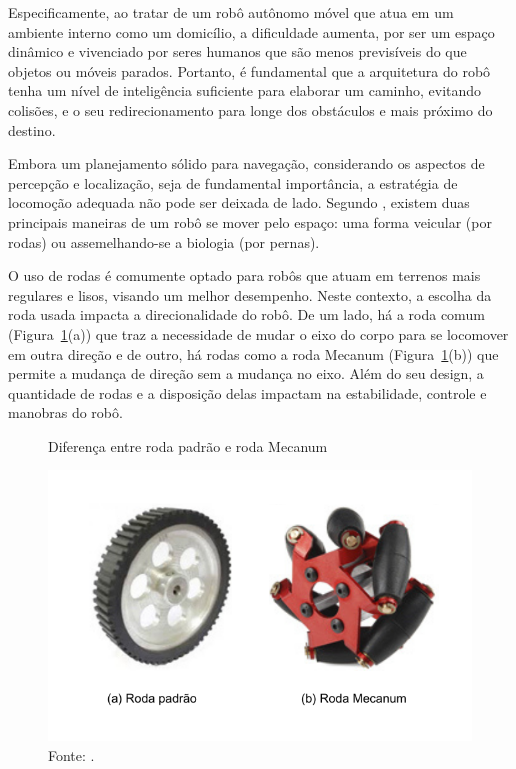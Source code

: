 Especificamente, ao tratar de um robô autônomo móvel que atua em um ambiente interno como um domicílio, a dificuldade aumenta, por ser um espaço dinâmico e vivenciado por seres humanos que são menos previsíveis do que objetos ou móveis parados. Portanto, é fundamental que a arquitetura do robô tenha um nível de inteligência suficiente para elaborar um caminho, evitando colisões, e o seu redirecionamento para longe dos obstáculos e mais próximo do destino.

Embora um planejamento sólido para navegação, considerando os aspectos de percepção e localização, seja de fundamental importância, a estratégia de locomoção adequada não pode ser deixada de lado. Segundo \citet{mobileRobotsSiegwart:2011}, existem duas principais maneiras de um robô se mover pelo espaço: uma forma veicular (por rodas) ou assemelhando-se a biologia (por pernas). 

O uso de rodas é comumente optado para robôs que atuam em terrenos mais regulares e lisos, visando um melhor desempenho. Neste contexto, a escolha da roda usada impacta a direcionalidade do robô. De um lado, há a roda comum (Figura~\ref{fig:rodas}(a)) que traz a necessidade de mudar o eixo do corpo para se locomover em outra direção e de outro, há rodas como a roda Mecanum (Figura~\ref{fig:rodas}(b)) que permite a mudança de direção sem a mudança no eixo. Além do seu design, a quantidade de rodas e a disposição delas impactam na estabilidade, controle e manobras do robô. 
 
\begin{figure}[h]
    \centering
    \caption{Diferença entre roda padrão e roda Mecanum}
    \includegraphics[scale=0.5]{rodas.png}
    \caption*{Fonte: \citet{wheels:2018}.}
    \label{fig:rodas}
\end{figure}

